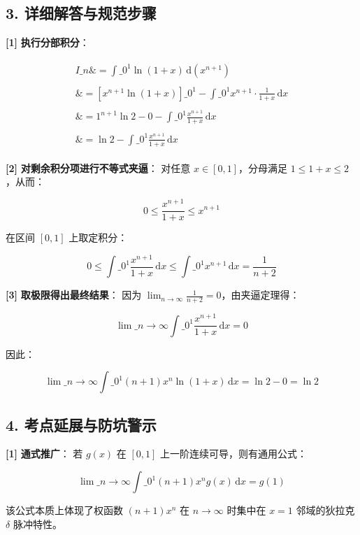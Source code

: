 \documentclass[11pt,a4paper,UTF8]{ctexart}
\begin{document}
\subsection{3. 详细解答与规范步骤}
\begin{solbox}[分步推导与答题规范]
\textbf{[1]}  \textbf{执行分部积分}：

\begin{align*}
\begin{aligned}
I\_n \&= \int\_0^1 \ln(1+x)\,\mathrm{d}(x^{n+1}) \\ \\
\&= \left[ x^{n+1}\ln(1+x) \right]\_0^1 - \int\_0^1 x^{n+1} \cdot \frac{1}{1+x}\,\mathrm{d}x \\ \\
\&= 1^{n+1}\ln 2 - 0 - \int\_0^1 \frac{x^{n+1}}{1+x}\,\mathrm{d}x \\ \\
\&= \ln 2 - \int\_0^1 \frac{x^{n+1}}{1+x}\,\mathrm{d}x
\end{aligned}
\end{align*}


\textbf{[2]}  \textbf{对剩余积分项进行不等式夹逼}：
对任意 $x \in [0, 1]$，分母满足 $1 \le 1+x \le 2$，从而：

\begin{equation*}
0 \le \frac{x^{n+1}}{1+x} \le x^{n+1}
\end{equation*}

在区间 $[0, 1]$ 上取定积分：

\begin{equation*}
0 \le \int\_0^1 \frac{x^{n+1}}{1+x}\,\mathrm{d}x \le \int\_0^1 x^{n+1}\,\mathrm{d}x = \frac{1}{n+2}
\end{equation*}


\textbf{[3]}  \textbf{取极限得出最终结果}：
因为 $\lim_{n \to \infty} \frac{1}{n+2} = 0$，由夹逼定理得：

\begin{equation*}
\lim\_{n \to \infty} \int\_0^1 \frac{x^{n+1}}{1+x}\,\mathrm{d}x = 0
\end{equation*}

因此：

\begin{equation*}
\lim\_{n \to \infty} \int\_0^1 (n+1) x^n \ln(1+x)\,\mathrm{d}x = \ln 2 - 0 = \ln 2
\end{equation*}

\end{solbox}


\subsection{4. 考点延展与防坑警示}
\begin{solbox}[分步推导与答题规范]
\textbf{[1]}  \textbf{通式推广}：
若 $g(x)$ 在 $[0, 1]$ 上一阶连续可导，则有通用公式：

\begin{equation*}
\lim\_{n \to \infty} \int\_0^1 (n+1)x^n g(x)\,\mathrm{d}x = g(1)
\end{equation*}

该公式本质上体现了权函数 $(n+1)x^n$ 在 $n \to \infty$ 时集中在 $x=1$ 邻域的狄拉克 $\delta$ 脉冲特性。
\end{solbox}
\end{document}
